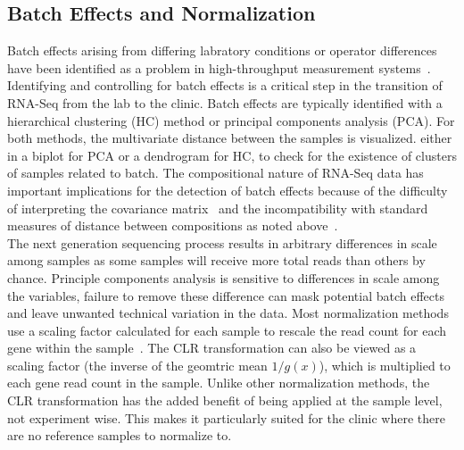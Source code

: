 \documentclass{article}\usepackage[]{graphicx}\usepackage[]{color}
\theoremstyle{definition}
\begin{document}
\subsection{Batch Effects and Normalization}
Batch effects arising from differing labratory conditions or operator differences have been identified as a problem in high-throughput measurement systems~\cite{leek2010, chen2011}.  Identifying and controlling for batch effects is a critical step in the transition of RNA-Seq from the lab to the clinic.  Batch effects are typically identified with a hierarchical clustering (HC) method or principal components analysis (PCA).  For both methods, the multivariate distance between the samples is visualized. either in a biplot for PCA or a dendrogram for HC, to check for the existence of clusters of samples related to batch. %
The compositional nature of RNA-Seq data has important implications for the detection of batch effects because of the difficulty of interpreting the covariance matrix~\cite{Aitchison1986} and the incompatibility with standard measures of distance between compositions as noted above~\cite{Aitchison1986,Martin-Fernandez1998}.\\  %

The next generation sequencing process results in arbitrary differences in scale among samples as some samples will receive more total reads than others by chance. Principle components analysis is sensitive to differences in scale among the variables, failure to remove these difference can mask potential batch effects and leave unwanted technical variation in the data.  Most normalization methods use a scaling factor calculated for each sample to rescale the read count for each gene within the sample~\cite{Dillies2013}.  The CLR transformation can also be viewed as a scaling factor (the inverse of the geomtric mean $1/g(x)$), which is multiplied to each gene read count in the sample.  Unlike other normalization methods, the CLR transformation has the added benefit of being applied at the sample level, not experiment wise.  This makes it particularly suited for the clinic where there are no reference samples to normalize to.\\
\end{document}
